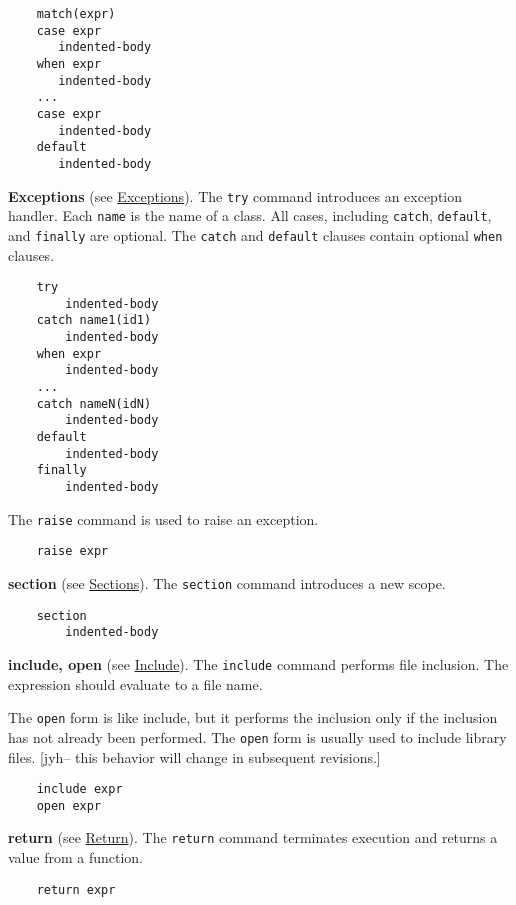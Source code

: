 \begin{verbatim}
    match(expr)
    case expr
       indented-body
    when expr
       indented-body
    ...
    case expr
       indented-body
    default
       indented-body
\end{verbatim}

\textbf{Exceptions} (see \href{omake-language.html#exceptions}{Exceptions}).  The \verb+try+ command
introduces an exception handler.  Each \verb+name+ is the name of a class.  All cases, including
\verb+catch+, \verb+default+, and \verb+finally+ are optional.  The \verb+catch+ and \verb+default+
clauses contain optional \verb+when+ clauses.

\begin{verbatim}
    try
        indented-body
    catch name1(id1)
        indented-body
    when expr
        indented-body
    ...
    catch nameN(idN)
        indented-body
    default
        indented-body
    finally
        indented-body
\end{verbatim}

The \verb+raise+ command is used to raise an exception.

\begin{verbatim}
    raise expr
\end{verbatim}        

\textbf{section} (see \href{omake-language.html#section}{Sections}).  The \verb+section+ command
introduces a new scope.

\begin{verbatim}
    section
        indented-body
\end{verbatim}

\textbf{include, open} (see \href{omake-language.html#include}{Include}).  The \verb+include+ command
performs file inclusion.  The expression should evaluate to a file name.

The \verb+open+ form is like include, but it performs the inclusion only if the inclusion has not
already been performed.  The \verb+open+ form is usually used to include library files.  [jyh-- this
behavior will change in subsequent revisions.]

\begin{verbatim}
    include expr
    open expr
\end{verbatim}

\textbf{return} (see \href{omake-language.html#functions}{Return}).  The \verb+return+ command
terminates execution and returns a value from a function.

\begin{verbatim}
    return expr
\end{verbatim}

